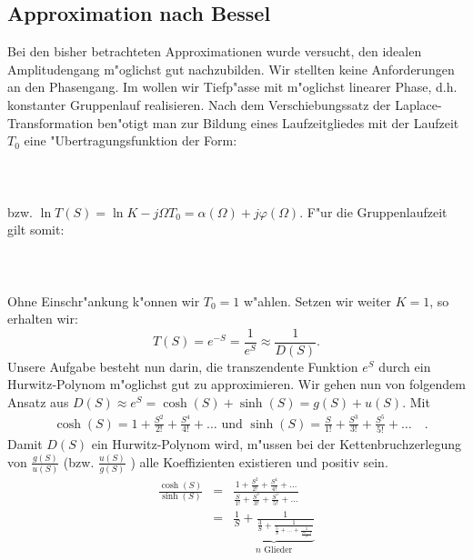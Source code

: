 \subsection{Approximation nach Bessel}
Bei den bisher betrachteten Approximationen wurde versucht, den
idealen Amplitudengang m"oglichst gut nachzubilden. Wir stellten keine
Anforderungen an den Phasengang.  Im  wollen wir Tiefp"asse
mit m"oglichst linearer Phase, d.h. konstanter Gruppenlauf
realisieren.  Nach dem Verschiebungssatz der Laplace-Transformation
ben"otigt man zur Bildung eines Laufzeitgliedes mit der Laufzeit
$T_{0}$ eine "Ubertragungsfunktion der Form:\\~\\
\\~~\\
\nit bzw. $\ln{T(S)}=\ln{K}-j\Omega T_{0}=\alpha(\Omega)+j \varphi(\Omega)$. F"ur die Gruppenlaufzeit gilt somit:\\~~\\
\\~\\
Ohne Einschr"ankung  k"onnen wir $T_{0}=1$
w"ahlen. Setzen wir weiter $K=1$, so erhalten wir:
\begin{equation}
T(S)=e^{-S}=\frac{1}{e^{S}} \approx \frac{1}{D(S)}.
\end{equation}
Unsere Aufgabe besteht nun darin, die transzendente
Funktion $e^{S}$ durch ein
Hurwitz-Polynom m"oglichst gut zu approximieren.
Wir gehen nun von folgendem Ansatz aus $D(S) \approx  e^{S}=\cosh{(S)} + \sinh{(S)}=g(S) + u(S)$. Mit
\begin{eqnarray*}
\text{ }\cosh{(S)}=1 + \frac{S^{2}}{2!} + \frac{S^{4}}{4!} +\ldots \text{ und } \sinh{(S)}=\frac{S}{1!} + \frac{S^{3}}{3!} + \frac{S^{5}}{5!} +\ldots\quad. \nonumber
\end{eqnarray*}
Damit $D(S)$ ein Hurwitz-Polynom wird, m"ussen bei der Kettenbruchzerlegung von
$\frac{g(S)}{u(S)}$ (bzw. $\frac{u(S)}{g(S)}$ ) alle Koeffizienten existieren
und positiv sein.
\begin{eqnarray}
\frac{\cosh{(S)}}{\sinh{(S)}} &=& \frac{1 + \frac{S^{2}}{2!} + \frac{S^{4}}{4!}
+\ldots}{\frac{S}{1!} + \frac{S^{3}}{3!} + \frac{S^{5}}{5!} +\ldots}
\nonumber\\
&=& \underbrace{
\displaystyle\frac{1}{S}+
\displaystyle\frac{1}{
\displaystyle\frac{3}{S}+
\displaystyle\frac{1}{
\displaystyle\frac{5}{S}+\ldots+
\displaystyle\frac{1}{
\displaystyle\frac{2n-1}{S}}}}
}_{\mbox{$n$~Glieder}}
\end{eqnarray}
